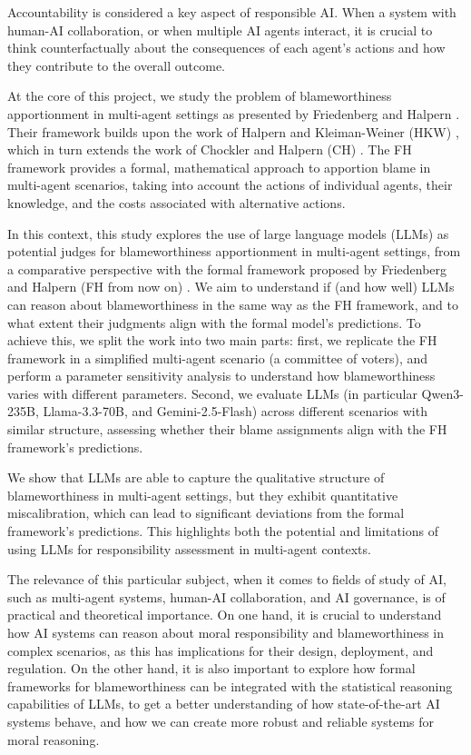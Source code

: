 \documentclass{article}
\begin{document}
Accountability is considered a key aspect of responsible AI. When a system with human-AI collaboration, or when multiple AI agents interact, it is crucial to think counterfactually about the consequences of each agent's actions and how they contribute to the overall outcome. 

At the core of this project, we study the problem of blameworthiness apportionment in multi-agent settings as presented by Friedenberg and Halpern \cite{friedenberg_blameworthiness_2019}. Their framework builds upon the work of Halpern and Kleiman-Weiner (HKW) \cite{halpern_towards_2018}, which in turn extends the work of Chockler and Halpern (CH) \cite{chockler_responsibility_2004}. The FH framework provides a formal, mathematical approach to apportion blame in multi-agent scenarios, taking into account the actions of individual agents, their knowledge, and the costs associated with alternative actions.

In this context, this study explores the use of large language models (LLMs) as potential judges for blameworthiness apportionment in multi-agent settings, from a comparative perspective with the formal framework proposed by Friedenberg and Halpern (FH from now on) \cite{friedenberg_blameworthiness_2019}. We aim to understand if (and how well) LLMs can reason about blameworthiness in the same way as the FH framework, and to what extent their judgments align with the formal model's predictions. To achieve this, we split the work into two main parts: first, we replicate the FH framework in a simplified multi-agent scenario (a committee of voters), and perform a parameter sensitivity analysis to understand how blameworthiness varies with different parameters. Second, we evaluate LLMs (in particular Qwen3-235B, Llama-3.3-70B, and Gemini-2.5-Flash) across different scenarios with similar structure, assessing whether their blame assignments align with the FH framework's predictions.

We show that LLMs are able to capture the qualitative structure of blameworthiness in multi-agent settings, but they exhibit quantitative miscalibration, which can lead to significant deviations from the formal framework's predictions. This highlights both the potential and limitations of using LLMs for responsibility assessment in multi-agent contexts.

The relevance of this particular subject, when it comes to fields of study of AI, such as multi-agent systems, human-AI collaboration, and AI governance, is of practical and theoretical importance. On one hand, it is crucial to understand how AI systems can reason about moral responsibility and blameworthiness in complex scenarios, as this has implications for their design, deployment, and regulation. On the other hand, it is also important to explore how formal frameworks for blameworthiness can be integrated with the statistical reasoning capabilities of LLMs, to get a better understanding of how state-of-the-art AI systems behave, and how we can create more robust and reliable systems for moral reasoning.
\end{document}
